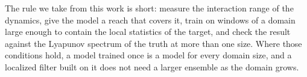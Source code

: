 The rule we take from this work is short: measure the interaction range
of the dynamics, give the model a reach that covers it, train on windows
of a domain large enough to contain the local statistics of the target,
and check the result against the Lyapunov spectrum of the truth at more
than one size. Where those conditions hold, a model trained once is a
model for every domain size, and a localized filter built on it does not
need a larger ensemble as the domain grows.
